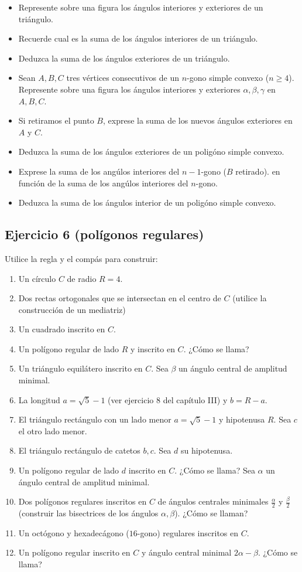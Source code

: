 \begin{itemize}
\item Represente sobre una figura los ángulos interiores y exteriores de
  un triángulo.
\item Recuerde cual es la suma de los ángulos interiores de un triángulo.
\item Deduzca la suma de los ángulos exteriores de un triángulo.
\item Sean $A, B, C$ tres vértices consecutivos de un $n$-gono
  simple convexo ($n \geq 4$).
  Represente sobre una figura los ángulos interiores y exteriores
  $\alpha, \beta, \gamma$
  en $A, B, C$.
\item Si retiramos el punto $B$, exprese la suma de los nuevos
  ángulos exteriores en $A$ y $C$.
\item Deduzca la suma de los ángulos exteriores de un poligóno simple convexo.
\item Exprese la suma de los angúlos interiores del $n-1$-gono ($B$ retirado).
  en función de la suma de los angúlos interiores del $n$-gono.
\item Deduzca la suma de los ángulos interior de un poligóno simple convexo.
\end{itemize}

\subsection{Ejercicio 6 (polígonos regulares)}

Utilice la regla y el compás para construir:

\begin{enumerate}
\item Un círculo $C$ de radio $R=4$.
\item Dos rectas ortogonales que se intersectan en el centro de $C$ (utilice
  la construcción de un mediatriz)
\item Un cuadrado inscrito en $C$.
\item Un polígono regular de lado $R$ y inscrito en $C$. ¿Cómo se llama?
\item Un triángulo equilátero inscrito en $C$.
  Sea $\beta$ un ángulo central de amplitud minimal.
\item La longitud $a=\sqrt{5} - 1$ (ver ejercicio 8 del capítulo III) y
  $b = R - a$.
\item El triángulo rectángulo con un lado menor $a = \sqrt{5} - 1$ y hipotenusa
  $R$. Sea $c$ el otro lado menor.
\item El triángulo rectángulo de catetos $b, c$. Sea $d$ su hipotenusa.
\item Un polígono regular de lado $d$ inscrito en $C$.
  ¿Cómo se llama? Sea $\alpha$ un ángulo central de amplitud minimal.
\item Dos polígonos regulares inscritos en $C$ de ángulos centrales minimales
  $\frac{\alpha}{2}$ y $\frac{\beta}{2}$ (construir las bisectrices de los
  ángulos $\alpha, \beta$). ¿Cómo se llaman?
\item Un octógono y hexadecágono ($16$-gono) regulares inscritos en $C$.
\item Un polígono regular inscrito en $C$ y
  ángulo central minimal $2 \alpha - \beta$. ¿Cómo se llama?
\end{enumerate}

